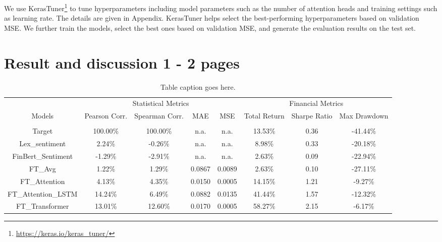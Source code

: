 \documentclass[11pt]{article}
\begin{document}
We use KerasTuner\footnote{\url{https://keras.io/keras_tuner/}} to tune hyperparameters including model parameters such as the number of attention heads and training settings such as learning rate. The details are given in Appendix. KerasTuner helps select the best-performing hyperparameters based on validation MSE. We further train the models, select the best ones based on validation MSE, and generate the evaluation results on the test set.

\section{Result and discussion 1 - 2 pages}



  \begin{table*}
  \centering
  \begin{tabular}{cccccccc}
     & \multicolumn{4}{c}{Statistical Metrics} & \multicolumn{3}{c}{Financial Metrics} \\
    \multirow{2}{2em}{Models} & \multirow{2}{2em}{Pearson Corr.} & \multirow{2}{2em}{Spearman Corr.} & \multirow{2}{*}{MAE} & \multirow{2}{*}{MSE} & \multirow{2}{2em}{Total Return} & \multirow{2}{2em}{Sharpe Ratio} & \multirow{2}{2em}{Max Drawdown} \\
    & & & & & & & \\
    \hline
    & & & & & & & \\

    Target & 100.00\% & 100.00\% & n.a. & n.a. & 13.53\% & 0.36 & -41.44\% \\
    Lex\_sentiment & 2.24\% & -0.26\% & n.a. & n.a. & 8.98\% & 0.33 & -20.18\% \\
    FinBert\_Sentiment & -1.29\% & -2.91\% & n.a. & n.a. & 2.63\% & 0.09 & -22.94\% \\
    FT\_Avg & 1.22\% & 1.29\% & 0.0867 & 0.0089 & 2.63\% & 0.10 & -27.11\% \\
    FT\_Attention & 4.13\% & 4.35\% & 0.0150 & 0.0005 & 14.15\% & 1.21 & -9.27\% \\
    FT\_Attention\_LSTM & 14.24\% & 6.49\% & 0.0882 & 0.0135 & 41.44\% & 1.57 & -12.32\% \\
    FT\_Transformer & 13.01\% & 12.60\% & 0.0170 & 0.0005 & 58.27\% & 2.15 & -6.17\% \\
    \hline
    \end{tabular}
      \caption{Table caption goes here.}
  \end{table*}
\end{document}
